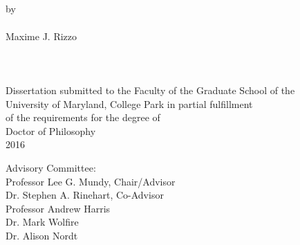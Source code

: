 \documentclass[
11pt, %
english, %
doublespacing, %
nolistspacing, %
liststotoc, %
toctotoc, %
headsepline, %
]{MastersDoctoralThesis} %
\renewcommand{\baselinestretch}{2}
\begin{document}
 
 

 \begin{titlepage}

\hbox{\ }
\vspace{1in}
\renewcommand{\baselinestretch}{1}
\small\normalsize
\begin{center}

\large{\ttitle }\\

\ \\
\ \\
\large{by} \\
\ \\
\large{Maxime J. Rizzo}%
\ \\
\ \\
\ \\
\ \\
\normalsize
Dissertation submitted to the Faculty of the Graduate School of the \\
University of Maryland, College Park in partial fulfillment \\
of the requirements for the degree of \\
Doctor of Philosophy \\
2016

\vspace{7.5em}
\end{center}

\noindent Advisory Committee: \\
Professor Lee G. Mundy, Chair/Advisor \\
Dr. Stephen A. Rinehart, Co-Advisor \\
Professor Andrew Harris \\
Dr. Mark Wolfire \\
Dr. Alison Nordt

\end{titlepage}
\end{document}
